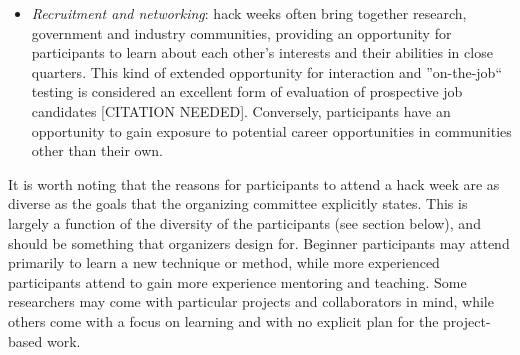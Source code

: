 \begin{itemize}
{Despite the impact of interdisciplinary research \citep{Hall2012-hi}, these experiments are often discouraged in traditional disciplinary research, because of the difficulty to achieve results in both disciplines, and because of the risks inherent in taking a less trodden path\footnote{\url{https://www.ncbi.nlm.nih.gov/labs/articles/12970550} and \url{https://www.researchgate.net/publication/8126355_EDUCATION_Risks_and_Rewards_of_an_Interdisciplinary_Research_Path}}.}

\item{\textit{Recruitment and networking}: hack weeks often bring together research, government and industry communities, providing an opportunity for participants to learn about each other's interests and their abilities in close quarters.
This kind of extended opportunity for interaction and ''on-the-job`` testing is considered an excellent form of evaluation of prospective job candidates [CITATION NEEDED].
Conversely, participants have an opportunity to gain exposure to potential career opportunities in communities other than their own.}
\end{itemize}

It is worth noting that the reasons for participants to attend a hack week are as diverse as the goals that the organizing committee explicitly states.
This is largely a function of the diversity of the participants (see section below), and should be something that organizers design for.
Beginner participants may attend primarily to learn a new technique or method, while more experienced participants attend to gain more experience mentoring and teaching.
Some researchers may come with particular projects and collaborators in mind, while others come with a focus on learning and with no explicit plan for the project-based work.

